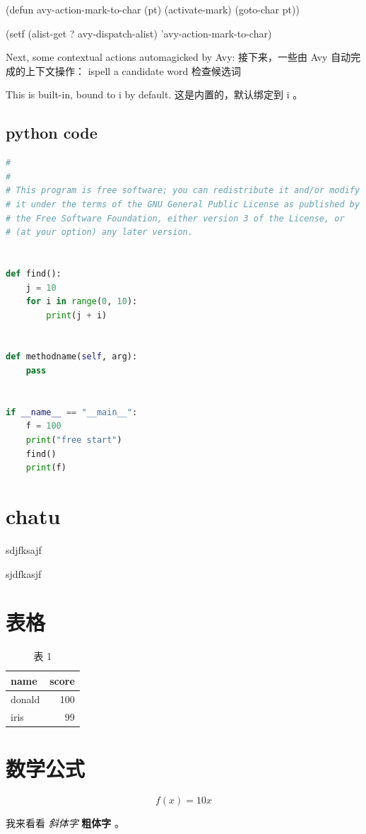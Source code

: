 \documentclass[lang=cn,color=blue]{elegantbook}
\begin{document}
(defun avy-action-mark-to-char (pt)
  (activate-mark)
  (goto-char pt))

(setf (alist-get ?  avy-dispatch-alist) 'avy-action-mark-to-char)

Next, some contextual actions automagicked by Avy:
接下来，一些由 Avy 自动完成的上下文操作：
ispell a candidate word
检查候选词

This is built-in, bound to i by default.
这是内置的，默认绑定到 i 。
\section{python code}
\label{sec:org4d6fc96}

\begin{lstlisting}[language=Python,numbers=none]
#
#
# This program is free software; you can redistribute it and/or modify
# it under the terms of the GNU General Public License as published by
# the Free Software Foundation, either version 3 of the License, or
# (at your option) any later version.


def find():
    j = 10
    for i in range(0, 10):
        print(j + i)


def methodname(self, arg):
    pass


if __name__ == "__main__":
    f = 100
    print("free start")
    find()
    print(f)

\end{lstlisting}
\chapter{chatu}
\label{sec:orgfb1913a}

sdjfksajf

\begin{center}

\label{org101aff6}
\end{center}

sjdfkasjf
\begin{center}

\label{orgb199073}
\end{center}
\chapter{表格}
\label{sec:org70adb03}

\begin{table}[htbp]
\caption{表 1}
\centering
\begin{tabular}{lr}
name & score\\
\hline
donald & 100\\
iris & 99\\
\end{tabular}
\end{table}
\chapter{数学公式}
\label{sec:org0295ec1}

$$f(x)=10x$$

我来看看 \emph{斜体字} \textbf{粗体字} 。
\end{document}
